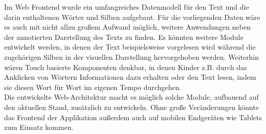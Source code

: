 Im Web Frontend wurde ein umfangreiches Datenmodell für den Text und die darin enthaltenen Wörter und Silben aufgebaut. Für die vorliegenden Daten wäre es auch mit nicht allzu großem Aufwand möglich, weitere Anwendungen neben der annotierten Darstellung des Texts zu finden. Es könnten weitere Module entwickelt werden, in denen der Text beispielsweise vorgelesen wird während die zugehörigen Silben in der visuellen Darstellung hervorgehoben werden. Weiterhin wären Touch basierte Komponenten denkbar, in denen Kinder z.B. durch das Anklicken von Wörtern Informationen dazu erhalten oder den Text lesen, indem sie diesen Wort für Wort im eigenen Tempo durchgehen.\\
Die entwickelte Web-Architektur macht es möglich solche Module, aufbauend auf den aktuellen Stand, zusätzlich zu entwickeln. Ohne große Veränderungen könnte das Frontend der Applikation außerdem auch auf mobilen Endgeräten wie Tablets zum Einsatz kommen.